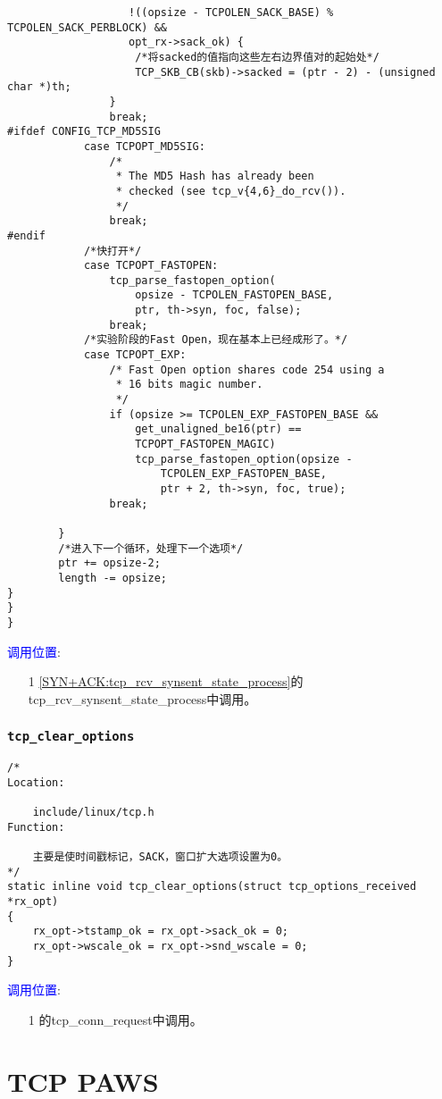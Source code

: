 \begin{verbatim}
				   !((opsize - TCPOLEN_SACK_BASE) % TCPOLEN_SACK_PERBLOCK) &&
				   opt_rx->sack_ok) {
					/*将sacked的值指向这些左右边界值对的起始处*/
					TCP_SKB_CB(skb)->sacked = (ptr - 2) - (unsigned char *)th;
				}
				break;
#ifdef CONFIG_TCP_MD5SIG
			case TCPOPT_MD5SIG:
				/*
				 * The MD5 Hash has already been
				 * checked (see tcp_v{4,6}_do_rcv()).
				 */
				break;
#endif
			/*快打开*/
			case TCPOPT_FASTOPEN:
				tcp_parse_fastopen_option(
					opsize - TCPOLEN_FASTOPEN_BASE,
					ptr, th->syn, foc, false);
				break;
			/*实验阶段的Fast Open，现在基本上已经成形了。*/
			case TCPOPT_EXP:
				/* Fast Open option shares code 254 using a
				 * 16 bits magic number.
				 */
				if (opsize >= TCPOLEN_EXP_FASTOPEN_BASE &&
					get_unaligned_be16(ptr) ==
					TCPOPT_FASTOPEN_MAGIC)
					tcp_parse_fastopen_option(opsize -
						TCPOLEN_EXP_FASTOPEN_BASE,
						ptr + 2, th->syn, foc, true);
				break;

		}
		/*进入下一个循环，处理下一个选项*/
		ptr += opsize-2;
		length -= opsize;
}
}
}
\end{verbatim}
		\textcolor{blue}{调用位置}:

			\begin{enumerate}
				\item[1]		\ref{SYN+ACK:tcp_rcv_synsent_state_process}的tcp\_rcv\_synsent\_state\_process中调用。
			\end{enumerate}
		\subsubsection{\texttt{tcp_clear_options}}
			\label{TCPOptions:tcp_clear_options}
\begin{verbatim}
/*
Location:

	include/linux/tcp.h
Function:
	
	主要是使时间戳标记，SACK，窗口扩大选项设置为0。
*/
static inline void tcp_clear_options(struct tcp_options_received *rx_opt)
{
	rx_opt->tstamp_ok = rx_opt->sack_ok = 0;
	rx_opt->wscale_ok = rx_opt->snd_wscale = 0;
}
\end{verbatim}

		\textcolor{blue}{调用位置}:
			\begin{enumerate}
				\item[1]		\label{Server:tcp_conn_request}的tcp\_conn\_request中调用。
			\end{enumerate}

\section{TCP PAWS}
